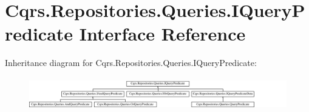 \hypertarget{interfaceCqrs_1_1Repositories_1_1Queries_1_1IQueryPredicate}{}\section{Cqrs.\+Repositories.\+Queries.\+I\+Query\+Predicate Interface Reference}
\label{interfaceCqrs_1_1Repositories_1_1Queries_1_1IQueryPredicate}
Inheritance diagram for Cqrs.\+Repositories.\+Queries.\+I\+Query\+Predicate\+:\begin{figure}[H]
\begin{center}
\leavevmode
\includegraphics[height=1.443299cm]{interfaceCqrs_1_1Repositories_1_1Queries_1_1IQueryPredicate}
\end{center}
\end{figure}
